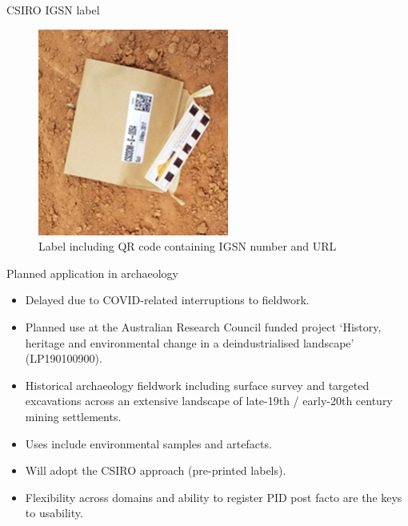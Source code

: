 \begin{frame}{CSIRO IGSN label}
 \begin{figure}[SI]
    \centering
    \vspace{-0.5cm}
        \includegraphics[height=.70\textheight]{figures/CSIRO-IGSN.png}
        \caption{Label including QR code containing IGSN number and URL}
        \label{fig:CSIRO IGSN label}
 \end{figure}
\end{frame}


\begin{frame}{Planned application in archaeology}
    \begin{itemize}
        \item Delayed due to COVID-related interruptions to fieldwork.
        \item Planned use at the Australian Research Council funded project ‘History, heritage and environmental change in a deindustrialised landscape’ (LP190100900).
        \item Historical archaeology fieldwork including surface survey and targeted excavations across an extensive landscape of late-19th / early-20th century mining settlements.
        \item Uses include environmental samples and artefacts.
        \item Will adopt the CSIRO approach (pre-printed labels).
        \item Flexibility across domains and ability to register PID post facto are the keys to usability.
    \end{itemize}
\end{frame}


